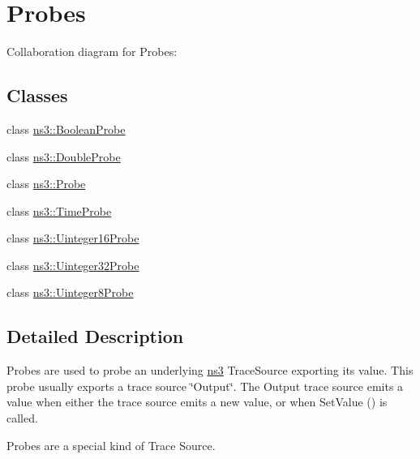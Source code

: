 \hypertarget{group__probes}{}\section{Probes}
\label{group__probes}
Collaboration diagram for Probes\+:
\subsection*{Classes}
\begin{DoxyCompactItemize}
\item 
class \hyperlink{classns3_1_1BooleanProbe}{ns3\+::\+Boolean\+Probe}
\item 
class \hyperlink{classns3_1_1DoubleProbe}{ns3\+::\+Double\+Probe}
\item 
class \hyperlink{classns3_1_1Probe}{ns3\+::\+Probe}
\item 
class \hyperlink{classns3_1_1TimeProbe}{ns3\+::\+Time\+Probe}
\item 
class \hyperlink{classns3_1_1Uinteger16Probe}{ns3\+::\+Uinteger16\+Probe}
\item 
class \hyperlink{classns3_1_1Uinteger32Probe}{ns3\+::\+Uinteger32\+Probe}
\item 
class \hyperlink{classns3_1_1Uinteger8Probe}{ns3\+::\+Uinteger8\+Probe}
\end{DoxyCompactItemize}


\subsection{Detailed Description}
Probes are used to probe an underlying \hyperlink{namespacens3}{ns3} Trace\+Source exporting its value. This probe usually exports a trace source \char`\"{}\+Output\char`\"{}. The Output trace source emits a value when either the trace source emits a new value, or when Set\+Value () is called.

Probes are a special kind of Trace Source. 